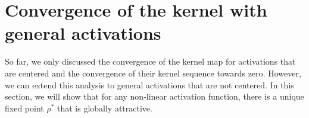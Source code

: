 \documentclass[twoside]{article}
\newcommand{\E}{\mathbb{E}\,}
\theoremstyle{definition}
\newcommand{\thomas}[1]{{\color{blue}TH:  \textit{#1}}}
\begin{document}






\section{Convergence of the kernel with general activations}
So far, we only discussed the convergence of the kernel map for activations that are centered and the convergence of their kernel sequence towards zero. However, we can extend this analysis to general activations that are not centered. In this section, we will show that for any non-linear activation function, there is a unique fixed point $\rho^*$ that is globally attractive.
\end{document}
